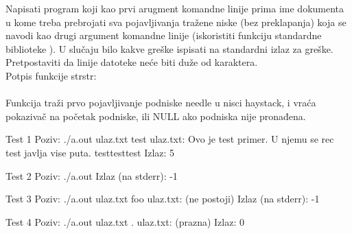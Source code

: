 \begin{Exercise}[label=904]

Napisati program koji kao prvi arugment komandne linije prima ime dokumenta u kome treba prebrojati sva pojavljivanja tražene niske (bez preklapanja) koja se navodi kao drugi argument komandne linije (iskoristiti funkciju standardne biblioteke ). U slučaju
bilo kakve greške ispisati  na standardni izlaz za greške.
Pretpostaviti da linije datoteke neće biti duže od 
karaktera.\\
Potpis funkcije strstr:\\
\\
Funkcija traži prvo pojavljivanje podniske needle u nisci
haystack, i vraća pokazivač na početak podniske, ili
NULL ako podniska nije pronađena.

\begin{miditest}
\begin{test}{Test 1}
Poziv:  ./a.out ulaz.txt test          
ulaz.txt:   Ovo je test primer.     
        U njemu se rec test javlja
        vise puta. testtesttest
Izlaz:  5                       
\end{test}
\end{miditest}
\begin{miditest}
\begin{test}{Test 2}
Poziv:   ./a.out      
Izlaz  (na stderr):  -1       
\end{test}
\end{miditest}


\begin{miditest}
\begin{test}{Test 3}
Poziv:   ./a.out ulaz.txt foo
ulaz.txt:   (ne postoji)      
Izlaz (na stderr):    -1              
\end{test}
\end{miditest}
\begin{miditest}
\begin{test}{Test 4}
Poziv:  ./a.out ulaz.txt .    
ulaz.txt:   (prazna)      
Izlaz:    0              
\end{test}
\end{miditest}

\end{Exercise}
\begin{Answer}[ref=904]
\end{Answer}


